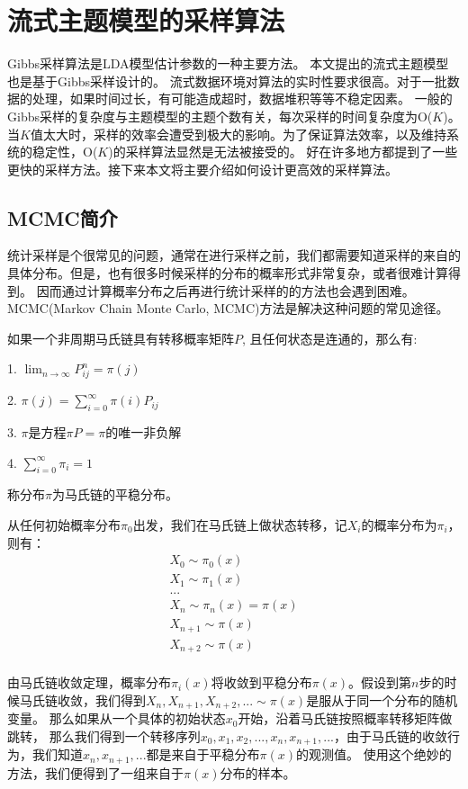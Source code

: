 \chapter{流式主题模型的采样算法}
\label{chapter:sample}
Gibbs采样算法是LDA模型估计参数的一种主要方法。
本文提出的流式主题模型也是基于Gibbs采样设计的。
流式数据环境对算法的实时性要求很高。对于一批数据的处理，如果时间过长，有可能造成超时，数据堆积等等不稳定因素。
一般的Gibbs采样的复杂度与主题模型的主题个数有关，每次采样的时间复杂度为O($K$)。
当$K$值太大时，采样的效率会遭受到极大的影响。为了保证算法效率，以及维持系统的稳定性，O($K$)的采样算法显然是无法被接受的。
好在许多地方都提到了一些更快的采样方法。接下来本文将主要介绍如何设计更高效的采样算法。

\section{MCMC简介}
统计采样是个很常见的问题，通常在进行采样之前，我们都需要知道采样的来自的具体分布。但是，也有很多时候采样的分布的概率形式非常复杂，或者很难计算得到。
因而通过计算概率分布之后再进行统计采样的的方法也会遇到困难。
MCMC(Markov Chain Monte Carlo, MCMC)方法是解决这种问题的常见途径。

\begin{theorem}[马氏链收敛定理]
如果一个非周期马氏链具有转移概率矩阵$P$, 且任何状态是连通的，那么有:

1. $\lim_{n\rightarrow \infty} P_{ij}^n = \pi(j)$

2. $\pi(j) = \sum_{i = 0}^{\infty}{\pi(i)P_{ij}}$

3. $\pi$是方程$\pi P = \pi$的唯一非负解

4. $\sum_{i=0}^{\infty}{\pi_i} =  1$

称分布$\pi$为马氏链的平稳分布。

\end{theorem}

从任何初始概率分布$\pi_0$出发，我们在马氏链上做状态转移，记$X_i$的概率分布为$\pi_i$，则有：
\begin{align*}
X_0 \sim \pi_0(x) \\
X_1 \sim \pi_1(x) \\
... \\
X_n \sim \pi_n(x) = \pi(x) \\
X_{n+1} \sim \pi(x) \\
X_{n+2} \sim \pi(x) \\
\end{align*}

由马氏链收敛定理，概率分布$\pi_i(x)$将收敛到平稳分布$\pi(x)$。假设到第$n$步的时候马氏链收敛，我们得到$X_n, X_{n+1}, X_{n+2}, ... \sim \pi(x)$是服从于同一个分布的随机变量。
那么如果从一个具体的初始状态$x_0$开始，沿着马氏链按照概率转移矩阵做跳转，
那么我们得到一个转移序列$x_0, x_1, x_2, ..., x_n , x_{n+1}, ...$，由于马氏链的收敛行为，我们知道$x_n, x_{n+1}, ...$都是来自于平稳分布$\pi(x)$的观测值。
使用这个绝妙的方法，我们便得到了一组来自于$\pi(x)$分布的样本。

